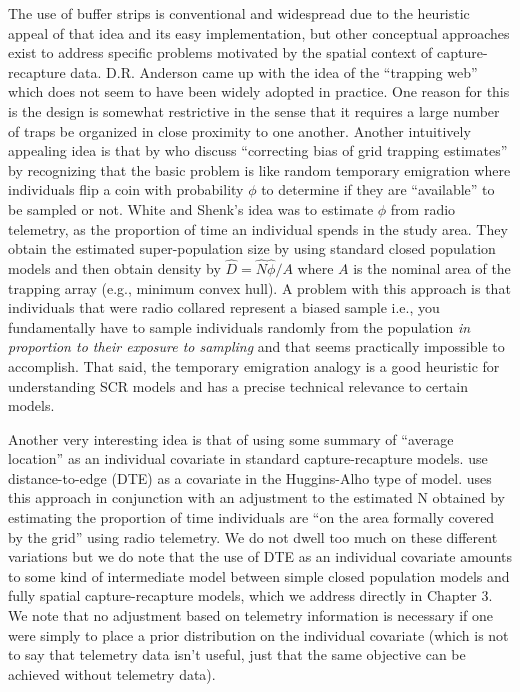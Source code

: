 The use of buffer strips is conventional and widespread due to the
heuristic appeal of that idea and its easy implementation, but other
conceptual approaches exist to address specific problems motivated by
the spatial context of capture-recapture data. D.R. Anderson came up
with the idea of the ``trapping web'' \citep{anderson_etal:1983} which
does not seem to have been widely adopted in practice.
One reason for this is 
the design is somewhat restrictive in the sense that it requires
a large number of traps be organized in close proximity to one
another. Another intuitively appealing idea is that by
\citet{white_shenk:2000} who discuss ``correcting bias of grid
trapping estimates'' by recognizing that the basic problem is like
random temporary emigration \citep{kendall_etal:1999}  where individuals flip a coin with
probability $\phi$ to determine if they are ``available'' to be sampled or not.
White and Shenk's idea was to estimate $\phi$ from radio telemetry, as the
proportion of time an individual spends in the study area. They obtain
the estimated super-population size by using standard closed
population models and then obtain density by $\hat{D} =
\hat{N}\hat{\phi}/A$ where $A$ is the nominal area of the trapping array
(e.g., minimum convex hull).  A problem with this approach is that 
individuals
that were radio collared represent a biased sample i.e.,
you fundamentally have to sample individuals randomly from the
population {\it in proportion to their exposure to sampling}
 and that seems practically impossible to accomplish.
That said, the temporary emigration
analogy is a good heuristic for understanding SCR models and has a
precise technical relevance to certain models.

Another very interesting idea is that of using some summary of
``average location'' as an individual covariate in standard
capture-recapture models. \citet{boulanger_mclellan:2001} use
distance-to-edge (DTE) as a covariate in the Huggins-Alho type of
model. \citet{ivan:2012} uses this approach in conjunction with an
adjustment to the estimated N obtained by estimating the proportion of
time individuals are ``on the area formally covered by the grid''
using radio telemetry.  We do not dwell too much on these different
variations but we do note that the use of DTE as an individual
covariate amounts to some kind of intermediate model between simple
closed population models and fully spatial capture-recapture models,
which we address directly in Chapter 3. We note that no adjustment
based on telemetry information is necessary if one were simply to
place a prior distribution on the individual covariate (which is not
to say that telemetry data isn't useful, just that the same objective
can be achieved without telemetry data).

